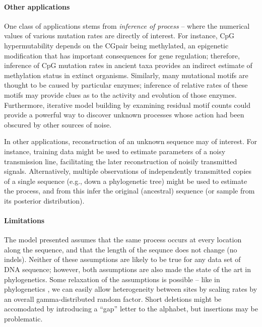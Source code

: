 \documentclass{article}
\newcommand{\nC}{\mbox{C}}
\newcommand{\nG}{\mbox{G}}
\theoremstyle{plain}
\theoremstyle{definition}
\begin{document}
\paragraph{Other applications}
One class of applications stems from \emph{inference of process} --
where the numerical values of various mutation rates are directly of interest.
For instance, CpG hypermutability depends on the \nC\nG pair being methylated,
an epigenetic modification that has important consequences for gene regulation;
therefore, inference of CpG mutation rates in ancient taxa provides an indirect estimate
of methylation status in extinct organisms.
Similarly, many mutational motifs are thought to be caused by particular enzymes;
inference of relative rates of these motifs
may provide clues as to the activity and evolution of those enzymes.
Furthermore, iterative model building by examining residual motif counts
could provide a powerful way to discover unknown processes
whose action had been obscured by other sources of noise.

In other applications, reconstruction of an unknown sequence may of interest.
For instance, training data might be used to estimate parameters of a noisy transmission line,
facilitating the later reconstruction of noisily transmitted signals.
Alternatively, multiple observations of independently transmitted copies of a single sequence
(e.g., down a phylogenetic tree)
might be used to estimate the process, and from this infer the original (ancestral) sequence
(or sample from its posterior distribution).

\paragraph{Limitations}
The model presented assumes that the same process occurs at every location along the sequence,
and that the length of the sequnce does not change (no indels).
Neither of these assumptions are likely to be true for any data set of DNA sequence;
however, both assumptions are also made the state of the art in phylogenetics.
Some relaxation of the assumptions is possible -- like in phylogenetics \citep{ratemixtures},
we can easily allow heterogeneity between sites by scaling rates by an overall gamma-distributed random factor.
Short deletions might be accomodated by introducing a ``gap'' letter to the alphabet,
but insertions may be problematic.
\end{document}

